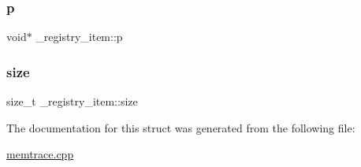 \mbox{\label{struct__registry__item_a7d2b50523d8801a40d30e17bfab37149}} 
\subsubsection{\texorpdfstring{p}{p}}
{\footnotesize\ttfamily void$\ast$ \+\_\+registry\+\_\+item\+::p}

\mbox{\label{struct__registry__item_a98122f145c9d8ef6b8e34c534307423d}} 
\subsubsection{\texorpdfstring{size}{size}}
{\footnotesize\ttfamily size\+\_\+t \+\_\+registry\+\_\+item\+::size}



The documentation for this struct was generated from the following file\+:\begin{DoxyCompactItemize}
\item 
\hyperlink{memtrace_8cpp}{memtrace.\+cpp}\end{DoxyCompactItemize}
